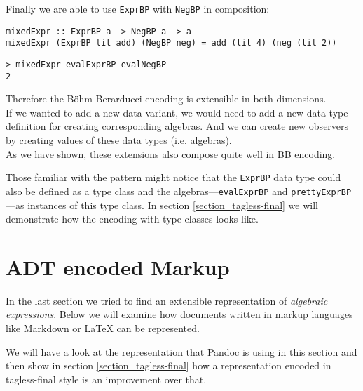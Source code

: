 Finally we are able to use \texttt{ExprBP} with \texttt{NegBP} in composition:

\begin{lstlisting}
mixedExpr :: ExprBP a -> NegBP a -> a
mixedExpr (ExprBP lit add) (NegBP neg) = add (lit 4) (neg (lit 2))
\end{lstlisting}
\begin{lstlisting}
> mixedExpr evalExprBP evalNegBP
2
\end{lstlisting}

Therefore the Böhm-Berarducci encoding is extensible in both dimensions.\\
If we wanted to add a new data variant, we would need to add a new data type
definition for creating corresponding algebras. And we can create new observers
by creating values of these data types (i.e. algebras).\\
As we have shown, these extensions also compose quite well in BB encoding.

Those familiar with the  pattern
\cite{scrap_type_classes} might notice that the \texttt{ExprBP} data type could
also be defined as a type class and the algebras—\texttt{evalExprBP} and
\texttt{prettyExprBP}—as instances of this type class. In section
\ref{section_tagless-final} we will demonstrate how the encoding with type
classes looks like.

%
\clearpage

\section{ADT encoded Markup}
\label{main_section}

In the last section we tried to find an extensible representation of
\emph{algebraic expressions}. Below we will examine how documents written in
markup languages like Markdown or \LaTeX{} can be represented.

We will have a look at the representation that Pandoc is using in this
section and then show in section \ref{section_tagless-final} how a
representation encoded in tagless-final style is an improvement over that.

